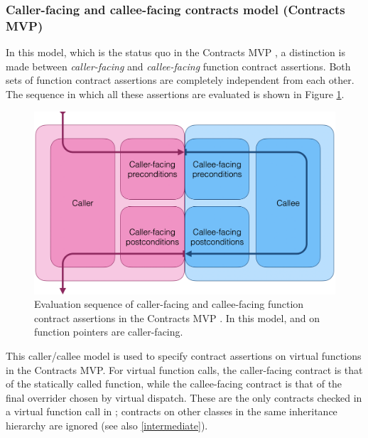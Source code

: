 
\subsubsection{Caller-facing and callee-facing contracts model (Contracts MVP)}

In this model, which is the status quo in the Contracts MVP \cite{P2900R8}, a distinction is made between \emph{caller-facing} and \emph{callee-facing} function contract assertions. Both sets of function contract assertions are completely independent from each other. The sequence in which all these assertions are evaluated is shown in Figure \ref{fig:callercallee}.

\begin{figure}[b]
\begin{center}
\includegraphics[scale=0.29]{images/D2900R9-callercallee}
\end{center}
\caption{Evaluation sequence of caller-facing and callee-facing function contract assertions in the Contracts MVP \cite{P2900R8}. In this model,  and  on function pointers are caller-facing.}
\label{fig:callercallee}
\end{figure}

This caller/callee model is used to specify contract assertions on virtual functions in the Contracts MVP. For virtual function calls, the caller-facing contract is that of the statically called function, while the callee-facing contract is that of the final overrider chosen by virtual dispatch. These are the only contracts checked in a virtual function call in \cite{P2900R8}; contracts on other classes in the same inheritance hierarchy are ignored (see also \ref{intermediate}).

